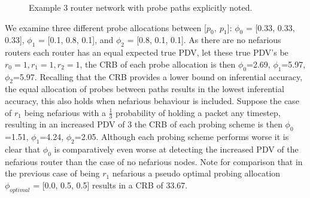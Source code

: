 \begin{figure}[H]
    \centering
    \caption{Example 3 router network with probe paths explicitly noted.}
    \label{fig:fimex3routereg}
\end{figure}

We examine three different probe allocations between [$p_0,\:p_1$]: $\phi_0$ = [0.33, 0.33, 0.33],  $\phi_1$ = [0.1, 0.8, 0.1], and $\phi_2$ = [0.8, 0.1, 0.1]. As there are no nefarious routers each router has an equal expected true PDV, let these true PDV's be $r_0=1, r_1=1, r_2=1$, the CRB of each probe allocation is then $\phi_0$=2.69, $\phi_1$=5.97, $\phi_2$=5.97. Recalling that the CRB provides a lower bound on inferential accuracy, the equal allocation of probes between paths results in the lowest inferential accuracy, this also holds when nefarious behaviour is included. Suppose the case of $r_1$ being nefarious with a $\frac{1}{3}$ probability of holding a packet any timestep, resulting in an increased PDV of 3 the CRB of each probing scheme is then $\phi_0$=1.51, $\phi_1$=4.24, $\phi_2$=2.05. Although each probing scheme performs worse it is clear that $\phi_0$ is comparatively even worse at detecting the increased PDV of the nefarious router than the case of no nefarious nodes. Note for comparison that in the previous case of being $r_1$ nefarious a pseudo optimal probing allocation $\phi_{optimal}$ = [0.0, 0.5, 0.5] results in a CRB of 33.67.

